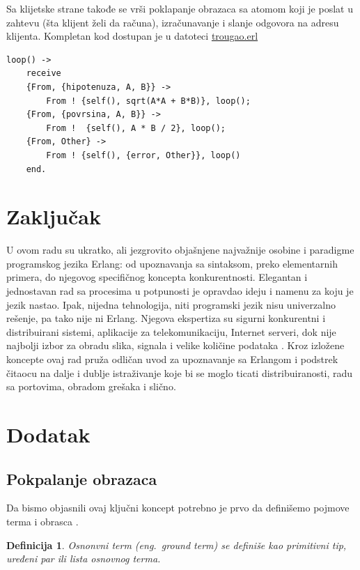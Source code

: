 \documentclass[a4paper]{article}
\newtheorem{definition}{Definicija}
\begin{document}
{Sa klijetske strane takođe se vrši poklapanje obrazaca sa atomom koji je poslat u zahtevu (šta klijent želi da računa), 
izračunavanje i slanje odgovora na adresu klijenta.
Kompletan kod dostupan je u datoteci \href{https://raw.githubusercontent.com/mrdakj/msnr/master/trougao.erl}{trougao.erl}
\begin{verbatim}
loop() ->
    receive
	{From, {hipotenuza, A, B}} -> 
	    From ! {self(), sqrt(A*A + B*B)}, loop();
	{From, {povrsina, A, B}} -> 
	    From !  {self(), A * B / 2}, loop();
	{From, Other} ->
	    From ! {self(), {error, Other}}, loop()
    end.
\end{verbatim}

\section{Zaključak}
\label{sec:zakljucak}
U ovom radu su ukratko, ali jezgrovito objašnjene najvažnije osobine i paradigme programskog jezika Erlang: 
od upoznavanja sa sintaksom, preko elementarnih primera, do njegovog specifičnog koncepta konkurentnosti. 
Elegantan i jednostavan rad sa procesima u potpunosti je opravdao ideju i namenu za koju je jezik nastao.
Ipak, nijedna tehnologija, niti programski jezik nisu univerzalno rešenje, pa tako nije ni Erlang. Njegova ekspertiza su sigurni konkurentni i distribuirani
sistemi, aplikacije za telekomunikaciju, Internet serveri, dok nije najbolji izbor za obradu slika, signala i velike količine podataka \cite{sajt}. 
Kroz izložene koncepte ovaj rad pruža odličan uvod za upoznavanje sa Erlangom i podstrek čitaocu na dalje i dublje istraživanje koje bi se moglo ticati distribuiranosti, radu sa portovima, obradom grešaka i slično.


\appendix
 


\newpage
\appendix
\section{Dodatak}

\subsection{Pokpalanje obrazaca}
\label{sec:poklapanje_obrazaca_formalno}
Da bismo objasnili ovaj ključni koncept potrebno je prvo da definišemo pojmove terma i obrasca \cite{phdthesis}.

\theoremstyle{definition}
\begin{definition}{Osnonvni term (eng.~{\em ground term})}
se definiše kao primitivni tip, uređeni par ili lista osnovnog terma.
\end{definition}

}
\end{document}

